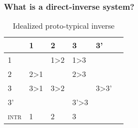 \documentclass[xcolor=table]{beamer}
\newcommand{\grise}[1]{\cellcolor{lightgray}\textbf{#1}}
\begin{document}
\begin{frame}
\frametitle{What is a direct-inverse system?}

\begin{table}[h]  \caption{Idealized proto-typical inverse} \label{tab:inverse-proto2}
\centering \label{tab:inv-proto2}
\begin{tabular}{l|lllll}
\toprule
&1 & 2 &3&3'\\
\hline
1 &\grise{} &1>2 \cellcolor[wave]{400}& 1>3\cellcolor[wave]{400}&\cellcolor[wave]{400} \\
2&2>1\cellcolor[wave]{500}&\grise{}&2>3 \cellcolor[wave]{400}&\cellcolor[wave]{400}\\
3&3>1\cellcolor[wave]{500}&3>2\cellcolor[wave]{500}&\grise{}&3>3'\cellcolor[wave]{400}\\
3'&\cellcolor[wave]{500}&\cellcolor[wave]{500}&3'>3\cellcolor[wave]{500}&\grise{}\\
\hline
\textsc{intr}&1&2&3\\
\bottomrule
\end{tabular}
\end{table}
\end{frame}
\end{document}
